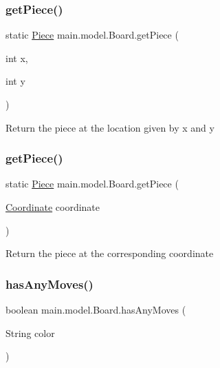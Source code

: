 \subsubsection{\texorpdfstring{get\+Piece()}{getPiece()}\hspace{0.1cm}{\footnotesize\ttfamily [1/2]}}
{\footnotesize\ttfamily static \hyperlink{classmain_1_1pieces_1_1_piece}{Piece} main.\+model.\+Board.\+get\+Piece (\begin{DoxyParamCaption}\item[{int}]{x,  }\item[{int}]{y }\end{DoxyParamCaption})\hspace{0.3cm}{\ttfamily [static]}}

Return the piece at the location given by x and y \hypertarget{classmain_1_1model_1_1_board_acf3676f6e319705c9ed713d1c9fd097a}{}\label{classmain_1_1model_1_1_board_acf3676f6e319705c9ed713d1c9fd097a} 
\subsubsection{\texorpdfstring{get\+Piece()}{getPiece()}\hspace{0.1cm}{\footnotesize\ttfamily [2/2]}}
{\footnotesize\ttfamily static \hyperlink{classmain_1_1pieces_1_1_piece}{Piece} main.\+model.\+Board.\+get\+Piece (\begin{DoxyParamCaption}\item[{\hyperlink{classmain_1_1model_1_1_coordinate}{Coordinate}}]{coordinate }\end{DoxyParamCaption})\hspace{0.3cm}{\ttfamily [static]}}

Return the piece at the corresponding coordinate \hypertarget{classmain_1_1model_1_1_board_aa3457acaf5b59679081273fc1e683be5}{}\label{classmain_1_1model_1_1_board_aa3457acaf5b59679081273fc1e683be5} 
\subsubsection{\texorpdfstring{has\+Any\+Moves()}{hasAnyMoves()}}
{\footnotesize\ttfamily boolean main.\+model.\+Board.\+has\+Any\+Moves (\begin{DoxyParamCaption}\item[{String}]{color }\end{DoxyParamCaption})}

